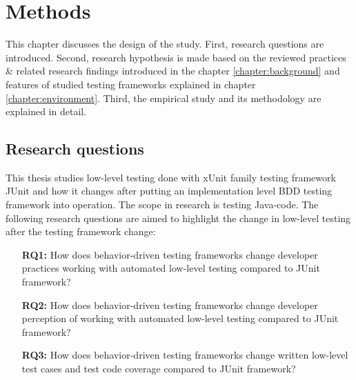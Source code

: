 \chapter{Methods}
\label{chapter:methods}
This chapter discusses the design of the study. First, research questions are introduced.
Second, research hypothesis is made based on the reviewed practices \& related research findings introduced in the chapter \ref{chapter:background}
and features of studied testing frameworks explained in chapter \ref{chapter:environment}.
Third, the empirical study and its methodology are explained in detail.

\section{Research questions}
This thesis studies low-level testing done with xUnit family testing framework JUnit and how it changes after putting
an implementation level BDD testing framework into operation. The scope in research is testing Java-code. The following
research questions are aimed to highlight the change in low-level testing after the testing framework change:
\begin{addmargin}[2em]{0em}
\vspace{20px}
\begin{itemize}
\item[\textbf{RQ1:}] How does behavior-driven testing frameworks change developer practices working with automated low-level testing compared to JUnit framework?
\item[\textbf{RQ2:}] How does behavior-driven testing frameworks change developer perception of working with automated low-level testing compared to JUnit framework?
\item[\textbf{RQ3:}] How does behavior-driven testing frameworks change written low-level test cases and test code coverage compared to JUnit framework?
\end{itemize}
\end{addmargin}

